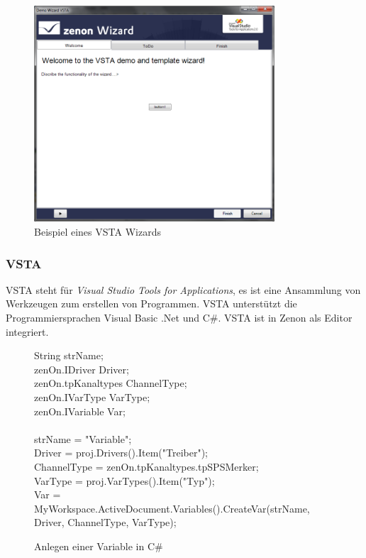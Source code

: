 \begin{figure}[h!]
		\centering
		\includegraphics[width=0.8\textwidth]{graphics/stateoftheart/demowizard.png}
		\caption{Beispiel eines VSTA Wizards}
\end{figure}

\subsubsection{VSTA}
VSTA steht für \textit{Visual Studio Tools for Applications}, es ist eine Ansammlung von Werkzeugen zum erstellen von Programmen. VSTA unterstützt die Programmiersprachen Visual Basic .Net und C\#.
VSTA ist in Zenon als Editor integriert.

\begin{figure}[h!]
	\begin{framed}
	\color{black}
		String strName;\\
		zenOn.IDriver Driver;\\
		zenOn.tpKanaltypes ChannelType;\\
		zenOn.IVarType VarType;\\
		zenOn.IVariable Var;\\
		\\
		strName = "Variable";\\
		Driver = proj.Drivers().Item("Treiber");\\
		ChannelType = zenOn.tpKanaltypes.tpSPSMerker;\\
		VarType = proj.VarTypes().Item("Typ");\\
		Var = MyWorkspace.ActiveDocument.Variables().CreateVar(strName, Driver, ChannelType, VarType);
	\end{framed}
	\caption{Anlegen einer Variable in C\#}
\end{figure}

